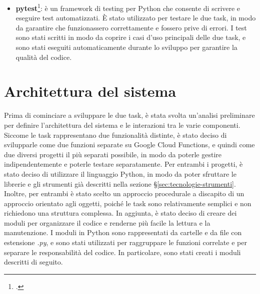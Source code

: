 \begin{itemize}
    \item \textbf{\gls{pytest}}\footcite{site:pytest}: è un framework di testing per Python che consente di scrivere e eseguire test automatizzati. È stato utilizzato per testare le due task, in modo da garantire che funzionassero correttamente e fossero prive di errori. I test sono stati scritti in modo da coprire i casi d'uso principali delle due task, e sono stati eseguiti automaticamente durante lo sviluppo per garantire la qualità del codice.
\end{itemize}


\section{Architettura del sistema}

Prima di cominciare a sviluppare le due task, è stata svolta un'analisi preliminare per definire l'architettura del sistema e le interazioni tra le varie componenti. Siccome le task rappresentano due funzionalità distinte, è stato deciso di svilupparle come due funzioni separate su Google Cloud Functions, e quindi come due diversi progetti il più separati possibile, in modo da poterle gestire indipendentemente e poterle testare separatamente.
Per entrambi i progetti, è stato deciso di utilizzare il linguaggio Python, in modo da poter sfruttare le librerie e gli strumenti già descritti nella sezione \S\ref{sec:tecnologie-strumenti}.
Inoltre, per entrambi è stato scelto un approccio procedurale a discapito di un approccio orientato agli oggetti, poiché le task sono relativamente semplici e non richiedono una struttura complessa. In aggiunta, è stato deciso di creare dei moduli per organizzare il codice e renderne più facile la lettura e la manutenzione.
I moduli in Python sono rappresentati da cartelle e da file con estensione \emph{.py}, e sono stati utilizzati per raggruppare le funzioni correlate e per separare le responsabilità del codice. In particolare, sono stati creati i moduli descritti di seguito.

